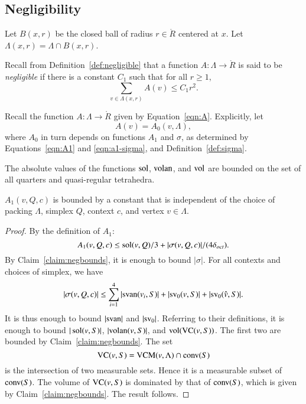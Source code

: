 \subsection{Negligibility} \label{sec:negligible}

Let $B(x,r)$ be the closed ball of radius $r\in\ring{R}$ centered
at $x$.  Let $\Lambda(x,r)=\Lambda\cap B(x,r)$.

Recall from Definition~\ref{def:negligible} that a function
$A:\Lambda\to\ring{R}$ is said to be {\it negligible} if there is a
constant $C_1$ such that for all $r\ge1$,
   $$\sum_{v\in\Lambda(x,r) } A(v) \le C_1 r^2.$$
%


Recall the function $A: \Lambda\to\ring{R}$ given by
Equation~\ref{eqn:A}.  Explicitly, let
   $$A(v) = A_0(v,\Lambda),$$
where $A_0$ in turn depends on functions $A_1$ and $\sigma$, as
determined by Equations~\ref{eqn:A1} and \ref{eqn:a1-sigma}, and
Definition~\ref{def:sigma}.

\begin{claim}\label{claim:negbounds}
    The absolute values of the functions $\operatorname{sol}$, ${\operatorname{volan}}$, and ${\operatorname{vol}}$
are bounded on the set of all quarters and
    quasi-regular tetrahedra.
\end{claim}


\begin{lemma}\label{lemma:A1bound}  $A_1(v,Q,c)$ is bounded by a constant that is
independent of the choice of packing $\Lambda$, simplex
$Q$, context $c$, and vertex $v\in\Lambda$.
\end{lemma}

\begin{proof} By the definition of $A_1$:
    $$
    A_1(v,Q,c) \le \operatorname{sol}(v,Q)/3 + |\sigma(v,Q,c)|/(4\delta_{oct}).
    $$
By Claim~\ref{claim:negbounds}, it is enough to bound $|\sigma|$.
For all contexts and choices of simplex, we have
    $$|\sigma(v,Q,c)|\le \sum_{i=1}^4 |{\operatorname{svan}}(v_i,S)| +
        |{\operatorname{sv}}_0(v,S)| 
      + |{\operatorname{sv}}_0(\hat v,S)|.
    $$
It is thus enough to bound $|{\operatorname{svan}}|$ and $|{\operatorname{sv}}_0|$.  Referring
to their definitions, it is enough to bound $|\operatorname{sol}(v,S)|$,
$|{\operatorname{volan}}(v,S)|$, and ${\operatorname{vol}}({\operatorname{VC}}(v,S))$. The first two
are bounded by Claim~\ref{claim:negbounds}.  The set
    $${\operatorname{VC}}(v,S) = {\operatorname{VCM}}(v,\Lambda)\cap {\operatorname{conv}}(S)$$
is the intersection of two measurable sets.  Hence it is a
measurable subset of ${\operatorname{conv}}(S)$.  The volume of ${\operatorname{VC}}(v,S)$ is
dominated by that of ${\operatorname{conv}}(S)$, which is given by
Claim~\ref{claim:negbounds}.  The result follows.
\end{proof}

